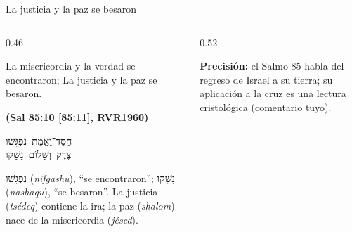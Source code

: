 \documentclass[hyperref={bookmarks=false},aspectratio=169]{beamer}
\newcommand{\heb}[1]{\mbox{\foreignlanguage{hebrew}{#1}}}
\newcommand{\fuente}[1]{\par\hfill{\upshape\bfseries\footnotesize\textcolor{azul}{#1}}}
\newcommand{\precision}[1]{{\footnotesize\color{gris}\textbf{Precisión:} #1}}
\begin{document}
\begin{frame}{La justicia y la paz se besaron}
\begin{columns}[c,onlytextwidth]
\begin{column}{0.46\textwidth}
\begin{cita}La misericordia y la verdad se encontraron; La justicia y la paz se besaron.\fuente{(Sal 85:10 [85:11], RVR1960)}\end{cita}
\begin{center}\heb{חֶסֶד־וֶאֱמֶת נִפְגָּשׁוּ}\\ \heb{צֶדֶק וְשָׁלוֹם נָשָׁקוּ}\end{center}
\scriptsize\heb{נִפְגָּשׁוּ} (\emph{nifgashu}), ``se encontraron''; \heb{נָשָׁקוּ} (\emph{nashaqu}), ``se besaron''. La justicia (\emph{tsédeq}) contiene la ira; la paz (\emph{shalom}) nace de la misericordia (\emph{jésed}).
\end{column}
\begin{column}{0.52\textwidth}
\centering
{}\par\smallskip
\precision{el Salmo 85 habla del regreso de Israel a su tierra; su aplicación a la cruz es una lectura cristológica (comentario tuyo).}
\end{column}
\end{columns}
\end{frame}
\end{document}
